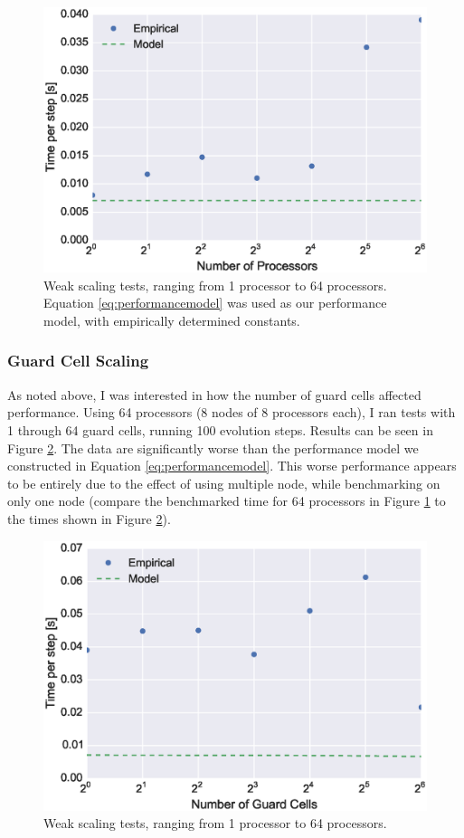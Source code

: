 \documentclass[iop, apj]{emulateapj}
\begin{document}
\begin{figure}[tbp]
\centering
\includegraphics[width=\linewidth]{plots/weak_scaling.eps} 
\caption{ Weak scaling tests, ranging from 1 processor to 64 processors.  Equation \ref{eq:performancemodel} was used as our performance model, with empirically determined constants. }
\label{fig:weakscaling}
\end{figure}

\subsubsection{Guard Cell Scaling}
As noted above, I was interested in how the number of guard cells affected performance.  Using 64 processors (8 nodes of 8 processors each), I ran tests with 1 through 64 guard cells, running 100 evolution steps. Results can be seen in Figure \ref{fig:guardcell}.  The data are significantly worse than the performance model we constructed in Equation \ref{eq:performancemodel}.  This worse performance appears to be entirely due to the effect of using multiple node, while benchmarking on only one node (compare the benchmarked time for 64 processors in Figure \ref{fig:weakscaling} to the times shown in Figure \ref{fig:guardcell}).

\begin{figure}[tbp]
\centering
\includegraphics[width=\linewidth]{plots/guard_cell_scaling.eps} 
\caption{ Weak scaling tests, ranging from 1 processor to 64 processors. }
\label{fig:guardcell}
\end{figure}
\end{document}

